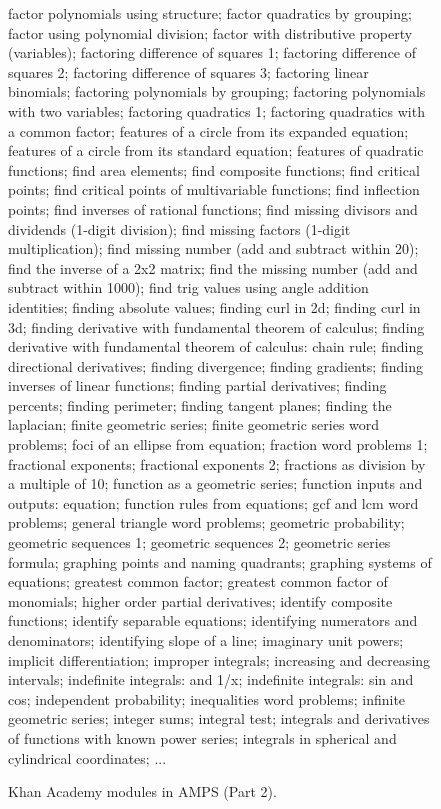 \documentclass{article}
\begin{document}
\begin{figure*}
factor polynomials using structure; factor quadratics by grouping; factor using polynomial division; factor with distributive property (variables); factoring difference of squares 1; factoring difference of squares 2; factoring difference of squares 3; factoring linear binomials; factoring polynomials by grouping; factoring polynomials with two variables; factoring quadratics 1; factoring quadratics with a common factor; features of a circle from its expanded equation; features of a circle from its standard equation; features of quadratic functions; find area elements; find composite functions; find critical points; find critical points of multivariable functions; find inflection points; find inverses of rational functions; find missing divisors and dividends (1-digit division); find missing factors (1-digit multiplication); find missing number (add and subtract within 20); find the inverse of a 2x2 matrix; find the missing number (add and subtract within 1000); find trig values using angle addition identities; finding absolute values; finding curl in 2d; finding curl in 3d; finding derivative with fundamental theorem of calculus; finding derivative with fundamental theorem of calculus: chain rule; finding directional derivatives; finding divergence; finding gradients; finding inverses of linear functions; finding partial derivatives; finding percents; finding perimeter; finding tangent planes; finding the laplacian; finite geometric series; finite geometric series word problems; foci of an ellipse from equation; fraction word problems 1; fractional exponents; fractional exponents 2; fractions as division by a multiple of 10; function as a geometric series; function inputs and outputs: equation; function rules from equations; gcf and lcm word problems; general triangle word problems; geometric probability; geometric sequences 1; geometric sequences 2; geometric series formula; graphing points and naming quadrants; graphing systems of equations; greatest common factor; greatest common factor of monomials; higher order partial derivatives; identify composite functions; identify separable equations; identifying numerators and denominators; identifying slope of a line; imaginary unit powers; implicit differentiation; improper integrals; increasing and decreasing intervals; indefinite integrals:  and 1/x; indefinite integrals: sin and cos; independent probability; inequalities word problems; infinite geometric series; integer sums; integral test; integrals and derivatives of functions with known power series; integrals in spherical and cylindrical coordinates; ...
\caption{Khan Academy modules in AMPS (Part 2).}
\label{fig:khan2}
\end{figure*}
\end{document}
